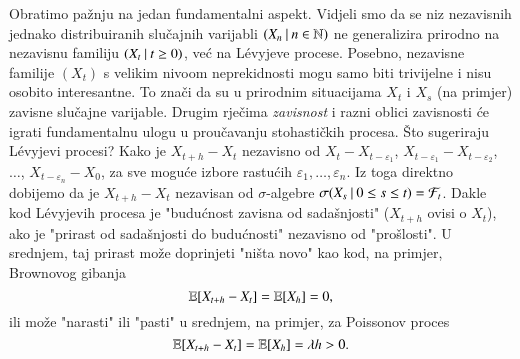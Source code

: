 \begin{nap} \label{nap:21.16}
    Obratimo pa\v znju na jedan fundamentalni aspekt.
    Vidjeli smo da se niz nezavisnih jednako distribuiranih slu\v cajnih varijabli $({X_n} \: | \: {n \in \mathbb{N}})$ ne generalizira prirodno na nezavisnu familiju $({X_t} \: | \: {t \geq 0})$, ve\' c na L\' evyjeve procese.
    Posebno,
    nezavisne familije $(X_t)$ s velikim nivoom neprekidnosti mogu samo biti trivijelne i nisu osobito interesantne.
    To zna\v ci da su u prirodnim situacijama $X_t$ i $X_s$ (na primjer) zavisne slu\v cajne varijable.
    Drugim rje\v cima \emph{zavisnost} i razni oblici zavisnosti \' ce igrati fundamentalnu ulogu u prou\v cavanju stohasti\v ckih procesa.
    \v Sto sugeriraju L\' evyjevi procesi?
    Kako je $X_{t + h} - X_t$ nezavisno od $X_t - X_{t - \varepsilon_1}$, $X_{t - \varepsilon_1} - X_{t - \varepsilon_2}$, $\ldots$, $X_{t - \varepsilon_n} - X_0$, za sve mogu\' ce izbore rastu\' cih $\varepsilon_1, \ldots, \varepsilon_n$.
    Iz toga direktno dobijemo da je $X_{t + h} - X_t$ nezavisan od $\sigma$-algebre $\sigma({X_s} \: | \: {0 \leq s \leq t}) = \mathcal{F}_t$.
    Dakle kod L\' evyjevih procesa je "budu\' cnost zavisna od sada\v snjosti" ($X_{t + h}$ ovisi o $X_t$), ako je "prirast od sada\v snjosti do budu\' cnosti" nezavisno od "pro\v slosti".
    U srednjem, taj prirast mo\v ze doprinjeti "ni\v sta novo" kao kod, na primjer, Brownovog gibanja
    \begin{equation*}
        \mathbb{E} [X_{t + h} - X_t] = \mathbb{E} [X_h] = 0,
    \end{equation*}
    ili mo\v ze "narasti" ili "pasti" u srednjem, na primjer, za Poissonov proces
    \begin{equation*}
        \mathbb{E} [X_{t + h} - X_t] = \mathbb{E} [X_h] = \lambda h > 0.
    \end{equation*}
\end{nap}